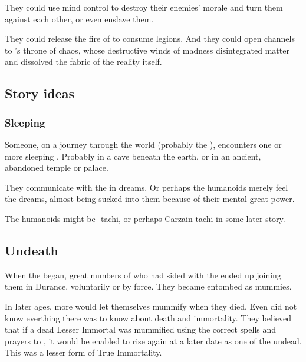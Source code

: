 They could use mind control to destroy their enemies' morale and turn them against each other, or even enslave them.

They could release the fire of  to consume legions. 
And they could open channels to \RuinSatha's throne of chaos, whose destructive winds of madness disintegrated matter and dissolved the fabric of the reality itself. 









\subsection{Story ideas}
\subsubsection{Sleeping \ophidians}
Someone, on a journey through the world (probably the \Wylde{}), encounters one or more sleeping \ophidians{}. 
Probably in a cave beneath the earth, or in an ancient, abandoned temple or palace. 

They communicate with the \ophidians{} in dreams. 
Or perhaps the humanoids merely feel the \psp{\ophidians} dreams, almost being sucked into them because of their mental great power. 

The humanoids might be \Shilred-tachi, or perhaps Carzain-tachi in some later story. 









\subsection{Undeath}
When the  began, great numbers of \ophidians who had sided with the \dragons ended up joining them in Durance, voluntarily or by force. 
They became entombed as mummies.

In later ages, more \ophidians would let themselves mummify when they died.
Even \Sethicus did not know everthing there was to know about death and immortality. 
They believed that if a dead Lesser Immortal was mummified using the correct spells and prayers to \KhothSell, it would be enabled to rise again at a later date as one of the undead. 
This was a lesser form of True Immortality. 

